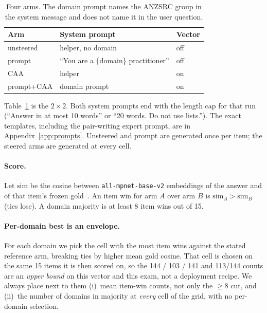 \documentclass{article} %
\begin{document}
\begin{table}[t]
\caption{Four arms. The domain prompt names the ANZSRC group in the system message and does not name it in the user question.}
\label{tab:arms}
\begin{center}
\small
\begin{tabular}{lll}
\toprule
\textbf{Arm} & \textbf{System prompt} & \textbf{Vector} \\
\midrule
unsteered & helper, no domain & off \\
prompt & ``You are a \{domain\} practitioner'' & off \\
CAA & helper & on \\
prompt+CAA & domain prompt & on \\
\bottomrule
\end{tabular}
\end{center}
\end{table}

Table~\ref{tab:arms} is the $2\times 2$.
Both system prompts end with the length cap for that run (``Answer in at most 10 words'' or ``20 words. Do not use lists.'').
The exact templates, including the pair-writing expert prompt, are in Appendix~\ref{app:prompts}.
Unsteered and prompt are generated once per item; the steered arms are generated at every cell.

\paragraph{Score.}
Let $\mathrm{sim}$ be the cosine between \texttt{all-mpnet-base-v2} embeddings of the answer and of that item's frozen gold~\citep{reimers2019sbert,song2020mpnet}.
An item win for arm $A$ over arm $B$ is $\mathrm{sim}_A > \mathrm{sim}_B$ (ties lose).
A domain majority is at least 8 item wins out of 15.

\paragraph{Per-domain best is an envelope.}
For each domain we pick the cell with the most item wins against the stated reference arm, breaking ties by higher mean gold cosine.
That cell is chosen on the same 15 items it is then scored on, so the 144 / 103 / 141 and 113/144 counts are an \emph{upper bound} on this vector and this exam, not a deployment recipe.
We always place next to them (i)~mean item-win counts, not only the $\geq 8$ cut, and (ii)~the number of domains in majority at \emph{every} cell of the grid, with no per-domain selection.
\end{document}
